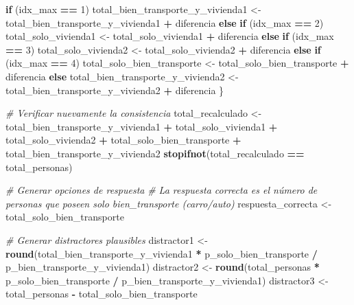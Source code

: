 \documentclass[
]{article}
\newenvironment{Shaded}{\begin{snugshade}}{\end{snugshade}}
\newcommand{\CommentTok}[1]{\textcolor[rgb]{0.56,0.35,0.01}{\textit{#1}}}
\newcommand{\ControlFlowTok}[1]{\textcolor[rgb]{0.13,0.29,0.53}{\textbf{#1}}}
\newcommand{\DecValTok}[1]{\textcolor[rgb]{0.00,0.00,0.81}{#1}}
\newcommand{\FunctionTok}[1]{\textcolor[rgb]{0.13,0.29,0.53}{\textbf{#1}}}
\newcommand{\NormalTok}[1]{#1}
\newcommand{\OtherTok}[1]{\textcolor[rgb]{0.56,0.35,0.01}{#1}}
\newcommand{\SpecialCharTok}[1]{\textcolor[rgb]{0.81,0.36,0.00}{\textbf{#1}}}
\begin{document}
\begin{Shaded}
\begin{Highlighting}[]
  \ControlFlowTok{if}\NormalTok{ (idx\_max }\SpecialCharTok{==} \DecValTok{1}\NormalTok{) total\_bien\_transporte\_y\_vivienda1 }\OtherTok{\textless{}{-}}\NormalTok{ total\_bien\_transporte\_y\_vivienda1 }\SpecialCharTok{+}\NormalTok{ diferencia}
  \ControlFlowTok{else} \ControlFlowTok{if}\NormalTok{ (idx\_max }\SpecialCharTok{==} \DecValTok{2}\NormalTok{) total\_solo\_vivienda1 }\OtherTok{\textless{}{-}}\NormalTok{ total\_solo\_vivienda1 }\SpecialCharTok{+}\NormalTok{ diferencia}
  \ControlFlowTok{else} \ControlFlowTok{if}\NormalTok{ (idx\_max }\SpecialCharTok{==} \DecValTok{3}\NormalTok{) total\_solo\_vivienda2 }\OtherTok{\textless{}{-}}\NormalTok{ total\_solo\_vivienda2 }\SpecialCharTok{+}\NormalTok{ diferencia}
  \ControlFlowTok{else} \ControlFlowTok{if}\NormalTok{ (idx\_max }\SpecialCharTok{==} \DecValTok{4}\NormalTok{) total\_solo\_bien\_transporte }\OtherTok{\textless{}{-}}\NormalTok{ total\_solo\_bien\_transporte }\SpecialCharTok{+}\NormalTok{ diferencia}
  \ControlFlowTok{else}\NormalTok{ total\_bien\_transporte\_y\_vivienda2 }\OtherTok{\textless{}{-}}\NormalTok{ total\_bien\_transporte\_y\_vivienda2 }\SpecialCharTok{+}\NormalTok{ diferencia}
\NormalTok{\}}

\CommentTok{\# Verificar nuevamente la consistencia}
\NormalTok{total\_recalculado }\OtherTok{\textless{}{-}}\NormalTok{ total\_bien\_transporte\_y\_vivienda1 }\SpecialCharTok{+}\NormalTok{ total\_solo\_vivienda1 }\SpecialCharTok{+}\NormalTok{ total\_solo\_vivienda2 }\SpecialCharTok{+}
\NormalTok{                    total\_solo\_bien\_transporte }\SpecialCharTok{+}\NormalTok{ total\_bien\_transporte\_y\_vivienda2}
\FunctionTok{stopifnot}\NormalTok{(total\_recalculado }\SpecialCharTok{==}\NormalTok{ total\_personas)}

\CommentTok{\# Generar opciones de respuesta}
\CommentTok{\# La respuesta correcta es el número de personas que poseen solo bien\_transporte (carro/auto)}
\NormalTok{respuesta\_correcta }\OtherTok{\textless{}{-}}\NormalTok{ total\_solo\_bien\_transporte}

\CommentTok{\# Generar distractores plausibles}
\NormalTok{distractor1 }\OtherTok{\textless{}{-}} \FunctionTok{round}\NormalTok{(total\_bien\_transporte\_y\_vivienda1 }\SpecialCharTok{*}\NormalTok{ p\_solo\_bien\_transporte }\SpecialCharTok{/}\NormalTok{ p\_bien\_transporte\_y\_vivienda1)}
\NormalTok{distractor2 }\OtherTok{\textless{}{-}} \FunctionTok{round}\NormalTok{(total\_personas }\SpecialCharTok{*}\NormalTok{ p\_solo\_bien\_transporte }\SpecialCharTok{/}\NormalTok{ p\_bien\_transporte\_y\_vivienda1)}
\NormalTok{distractor3 }\OtherTok{\textless{}{-}}\NormalTok{ total\_personas }\SpecialCharTok{{-}}\NormalTok{ total\_solo\_bien\_transporte}


\end{Highlighting}
\end{Shaded}
\end{document}
